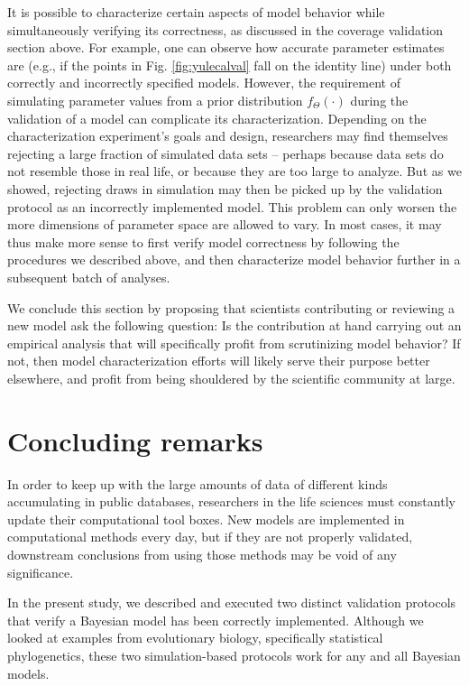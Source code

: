 \documentclass[oneside]{article}
\begin{document}
It is possible to characterize certain aspects of model behavior while simultaneously verifying its correctness, as discussed in the coverage validation section above.
For example, one can observe how accurate parameter estimates are (e.g., if the points in Fig. \ref{fig:yulecalval} fall on the identity line) under both correctly and incorrectly specified models.
However, the requirement of simulating parameter values from a prior distribution $f_{\Theta}(\cdot)$ during the validation of a model can complicate its characterization.
Depending on the characterization experiment's goals and design, researchers may find themselves rejecting a large fraction of simulated data sets -- perhaps because data sets do not resemble those in real life, or because they are too large to analyze.
But as we showed, rejecting draws in simulation may then be picked up by the validation protocol as an incorrectly implemented model.
This problem can only worsen the more dimensions of parameter space are allowed to vary.
In most cases, it may thus make more sense to first verify model correctness by following the procedures we described above, and then characterize model behavior further in a subsequent batch of analyses.

We conclude this section by proposing that scientists contributing or reviewing a new model ask the following question: Is the contribution at hand carrying out an empirical analysis that will specifically profit from scrutinizing model behavior?
If not, then model characterization efforts will likely serve their purpose better elsewhere, and profit from being shouldered by the scientific community at large.

\section*{Concluding remarks}

In order to keep up with the large amounts of data of different kinds accumulating in public databases, researchers in the life sciences must constantly update their computational tool boxes.
New models are implemented in computational methods every day, but if they are not properly validated, downstream conclusions from using those methods may be void of any significance.

In the present study, we described and executed two distinct validation protocols that verify a Bayesian model has been correctly implemented.
Although we looked at examples from evolutionary biology, specifically statistical phylogenetics, these two simulation-based protocols work for any and all Bayesian models.
\end{document}
